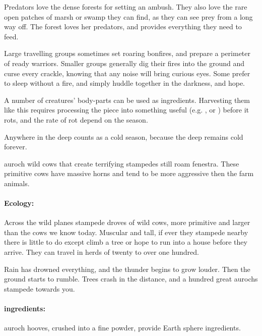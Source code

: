 \begin{multicols}{2}

\noindent
Predators love the dense forests for setting an ambush.
They also love the rare open patches of marsh or swamp they can find, as they can see prey from a long way off.
The forest loves her predators, and provides everything they need to feed.

Large travelling groups sometimes set roaring bonfires, and prepare a perimeter of ready warriors.
Smaller groups generally dig their fires into the ground and curse every crackle, knowing that any noise will bring curious eyes.
Some prefer to sleep without a fire, and simply huddle together in the darkness, and hope.

\rotRates
A number of creatures' body-parts can be used as \glspl{ingredient}.
Harvesting them like this requires processing the piece into something useful (e.g. , or ) before it rots, and the rate of rot depend on the season.

Anywhere in the \gls{deep} counts as a cold season, because the \gls{deep} remains cold forever.

  {auroch}%
  {wild cows that create terrifying stampedes}%
still roam \gls{fenestra}.
These primitive cows have massive horns and tend to be more aggressive then the farm animals.


\paragraph{Ecology:} Across the wild planes stampede droves of wild cows, more primitive and larger than the cows we know today.
Muscular and tall, if ever they stampede nearby there is little to do except climb a tree or hope to run into a house before they arrive.
They can travel in herds of twenty to over one hundred.

\begin{boxtext}
  Rain has drowned everything, and the thunder begins to grow louder.
  Then the ground starts to rumble.
  Trees crash in the distance, and a hundred great aurochs stampede towards you.
\end{boxtext}

\paragraph{\Glspl{ingredient}:}
auroch hooves, crushed into a fine powder, provide Earth \gls{sphere} \glspl{ingredient}.


\end{multicols}

